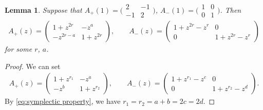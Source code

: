 \documentclass[10pt,a4paper]{amsart}
\numberwithin{equation}{section}
\newtheorem{Lemma}[Theorem]{Lemma}
\theoremstyle{definition}
\begin{document}
\begin{Lemma}\label{lemma:Apm(z) 4}
 Suppose that
$
 A_{+}(1) =
 \bigl( \begin{smallmatrix}
 2 & - 1 \\
 -1 & 2
\end{smallmatrix}\bigr)$, $
 A_{-}(1) =
 \bigl( \begin{smallmatrix}
 1 & 0 \\
 0 & 1
\end{smallmatrix}\bigr)$.
 Then
 \begin{align*}
 A_{+}(z) =
 \begin{pmatrix}
 1+z^{2r} & - z^a \\
 -z^{2r-a} & 1+z^{2r}
 \end{pmatrix},\qquad
 A_{-}(z) =
 \begin{pmatrix}
 1+z^{2r}-z^r & 0 \\
 0 & 1+z^{2r}-z^r
 \end{pmatrix}
 \end{align*}
 for some $r$, $a$.
\end{Lemma}
\begin{proof}
 We can set
 \begin{align*}
 A_{+}(z) =
 \begin{pmatrix}
 1+z^{r_1} & - z^a \\
 -z^b & 1+z^{r_2}
 \end{pmatrix},\qquad
 A_{-}(z) =
 \begin{pmatrix}
 1+z^{r_1}-z^c & 0 \\
 0 & 1+z^{r_2}-z^d
 \end{pmatrix}.
 \end{align*}
 By \eqref{eq:symplectic property},
 we have $r_1=r_2=a+b=2c=2d$.
\end{proof}
\end{document}
